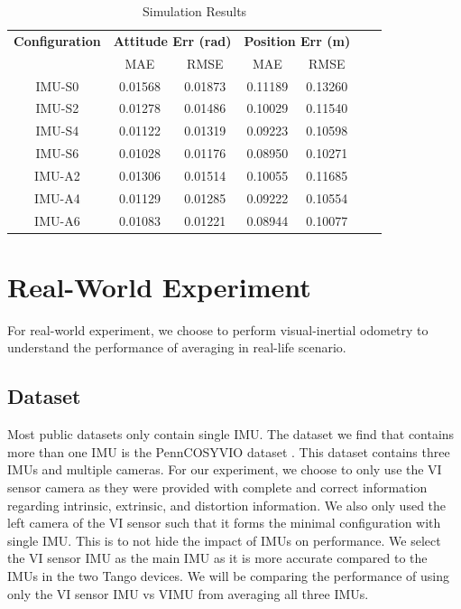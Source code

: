 \documentclass[conference]{IEEEtran}
\begin{document}
\begin{table}[h!]
\centering
\caption{Simulation Results}
\label{tab:sim_result}
\begin{tabular}{ccccccc}
\toprule
\textbf{Configuration} & \multicolumn{2}{c}{\textbf{Attitude Err (rad)}} & \multicolumn{2}{c}{\textbf{Position Err (m)}} \\
\cmidrule(lr){2-3} \cmidrule(lr){4-5}
& MAE & RMSE & MAE & RMSE \\
\midrule
IMU-S0 & 0.01568 & 0.01873 & 0.11189 & 0.13260 \\
\midrule
IMU-S2 & 0.01278 & 0.01486 & 0.10029 & 0.11540 \\
IMU-S4 & 0.01122 & 0.01319 & 0.09223 & 0.10598 \\
IMU-S6 & 0.01028 & 0.01176 & 0.08950  & 0.10271 \\
\midrule
IMU-A2 & 0.01306 & 0.01514 & 0.10055 & 0.11685 \\
IMU-A4 & 0.01129 & 0.01285 & 0.09222 & 0.10554 \\
IMU-A6 & 0.01083 & 0.01221 & 0.08944 & 0.10077 \\
\bottomrule
\end{tabular}
\end{table}

\section{Real-World Experiment}

For real-world experiment, we choose to perform visual-inertial odometry to understand the performance of averaging in real-life scenario.

\subsection{Dataset}

Most public datasets only contain single IMU. The dataset we find that contains more than one IMU is the PennCOSYVIO dataset \cite{penncosyvio}. This dataset contains three IMUs and multiple cameras. For our experiment, we choose to only use the VI sensor camera as they were provided with complete and correct information regarding intrinsic, extrinsic, and distortion information. We also only used the left camera of the VI sensor such that it forms the minimal configuration with single IMU. This is to not hide the impact of IMUs on performance. We select the VI sensor IMU as the main IMU as it is more accurate compared to the IMUs in the two Tango devices. We will be comparing the performance of using only the VI sensor IMU vs VIMU from averaging all three IMUs.
\end{document}
